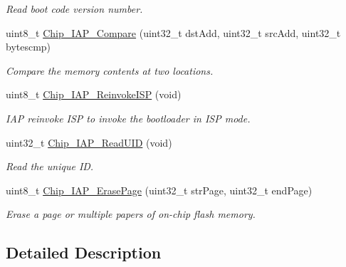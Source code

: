 \begin{DoxyCompactItemize}
\begin{DoxyCompactList}\small\item\em Read boot code version number. \end{DoxyCompactList}\item 
uint8\+\_\+t \hyperlink{group___c_o_m_m_o_n___i_a_p_ga0f3983319210f99d1931f1e9fa762d9e}{Chip\+\_\+\+I\+A\+P\+\_\+\+Compare} (uint32\+\_\+t dst\+Add, uint32\+\_\+t src\+Add, uint32\+\_\+t bytescmp)
\begin{DoxyCompactList}\small\item\em Compare the memory contents at two locations. \end{DoxyCompactList}\item 
uint8\+\_\+t \hyperlink{group___c_o_m_m_o_n___i_a_p_ga91a6ef5cac3a052f637cf0b5d7d31d53}{Chip\+\_\+\+I\+A\+P\+\_\+\+Reinvoke\+I\+S\+P} (void)
\begin{DoxyCompactList}\small\item\em I\+A\+P reinvoke I\+S\+P to invoke the bootloader in I\+S\+P mode. \end{DoxyCompactList}\item 
uint32\+\_\+t \hyperlink{group___c_o_m_m_o_n___i_a_p_ga2835e129423f1ce0628004a8adf00773}{Chip\+\_\+\+I\+A\+P\+\_\+\+Read\+U\+I\+D} (void)
\begin{DoxyCompactList}\small\item\em Read the unique I\+D. \end{DoxyCompactList}\item 
uint8\+\_\+t \hyperlink{group___c_o_m_m_o_n___i_a_p_ga95ca28fb39884184657054e134671f95}{Chip\+\_\+\+I\+A\+P\+\_\+\+Erase\+Page} (uint32\+\_\+t str\+Page, uint32\+\_\+t end\+Page)
\begin{DoxyCompactList}\small\item\em Erase a page or multiple papers of on-\/chip flash memory. \end{DoxyCompactList}\end{DoxyCompactItemize}


\subsection{Detailed Description}


